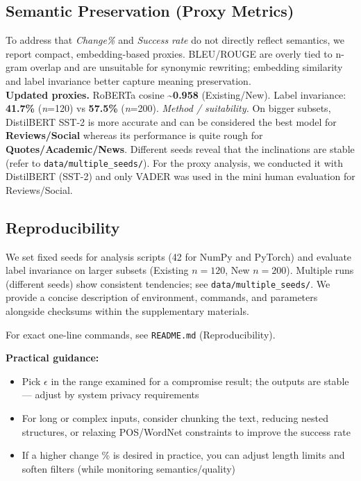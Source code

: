 \documentclass[11pt]{article}
\begin{document}
\subsection{Semantic Preservation (Proxy Metrics)}
To address that \textit{Change\%} and \textit{Success rate} do not directly reflect semantics, we report compact, embedding-based proxies. BLEU/ROUGE are overly tied to n-gram overlap and are unsuitable for synonymic rewriting; embedding similarity and label invariance better capture meaning preservation.\\
\textbf{Updated proxies.} RoBERTa cosine \textasciitilde{}\textbf{0.958} (Existing/New). Label invariance: \textbf{41.7\%} (\textit{n}=120) vs \textbf{57.5\%} (\textit{n}=200).
\noindent\textit{Method / suitability.} On bigger subsets, DistilBERT SST‑2 is more accurate and can be considered the best model for \textbf{Reviews/Social} whereas its performance is quite rough for \textbf{Quotes/Academic/News}. Different seeds reveal that the inclinations are stable (refer to \texttt{data/multiple\_seeds/}). For the proxy analysis, we conducted it with DistilBERT (SST-2) and only VADER was used in the mini human evaluation for Reviews/Social.

\subsection{Reproducibility}
We set fixed seeds for analysis scripts (42 for NumPy and PyTorch) and evaluate label invariance on larger subsets (Existing $n=120$, New $n=200$). Multiple runs (different seeds) show consistent tendencies; see \texttt{data/multiple\_seeds/}. We provide a concise description of environment, commands, and parameters alongside checksums within the supplementary materials.

\noindent For exact one-line commands, see \texttt{README.md} (Reproducibility).





\textbf{Practical guidance:}
\begin{itemize}[leftmargin=*]
  \item Pick $\epsilon$ in the range examined for a compromise result; the outputs are stable — adjust by system privacy requirements
  \item For long or complex inputs, consider chunking the text, reducing nested structures, or relaxing POS/WordNet constraints to improve the success rate
  \item If a higher change \% is desired in practice, you can adjust length limits and soften filters (while monitoring semantics/quality)
\end{itemize}
\end{document}
